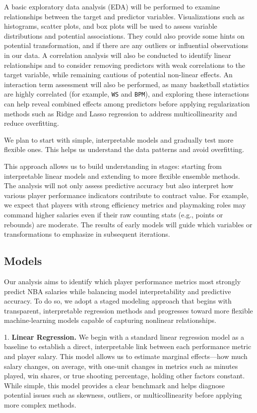 \documentclass{article}
\theoremstyle{plain}
\theoremstyle{definition}
\theoremstyle{remark}
\begin{document}
A basic exploratory data analysis (EDA) will be performed to examine relationships between the target and predictor variables. Visualizations such as histograms, scatter plots, and box plots will be used to assess variable distributions and potential associations. They could also provide some hints on potential transformation, and if there are any outliers or influential observations in our data. A correlation analysis will also be conducted to identify linear relationships and to consider removing predictors with weak correlations to the target variable, while remaining cautious of potential non-linear effects. An interaction term assessment will also be performed, as many basketball statistics are highly correlated (for example, \texttt{WS} and \texttt{BPM}), and exploring these interactions can help reveal combined effects among predictors before applying regularization methods such as Ridge and Lasso regression to address multicollinearity and reduce overfitting. 

We plan to start with simple, interpretable models and gradually test more flexible ones. This helps us understand the data patterns and avoid overfitting.

This approach allows us to build understanding in stages: starting from interpretable linear models and extending to more flexible ensemble methods. The analysis will not only assess predictive accuracy but also interpret how various player performance indicators contribute to contract value. For example, we expect that players with strong efficiency metrics and playmaking roles may command higher salaries even if their raw counting stats (e.g., points or rebounds) are moderate. The results of early models will guide which variables or transformations to emphasize in subsequent iterations.

\subsection*{Models}

Our analysis aims to identify which player performance metrics most strongly predict NBA salaries while balancing model interpretability and predictive accuracy. To do so, we adopt a staged modeling approach that begins with transparent, interpretable regression methods and progresses toward more flexible machine-learning models capable of capturing nonlinear relationships.

1. \textbf{Linear Regression.}
We begin with a standard linear regression model as a baseline to establish a direct, interpretable link between each performance metric and player salary. This model allows us to estimate marginal effects—how much salary changes, on average, with one-unit changes in metrics such as minutes played, win shares, or true shooting percentage, holding other factors constant. While simple, this model provides a clear benchmark and helps diagnose potential issues such as skewness, outliers, or multicollinearity before applying more complex methods.
\end{document}
